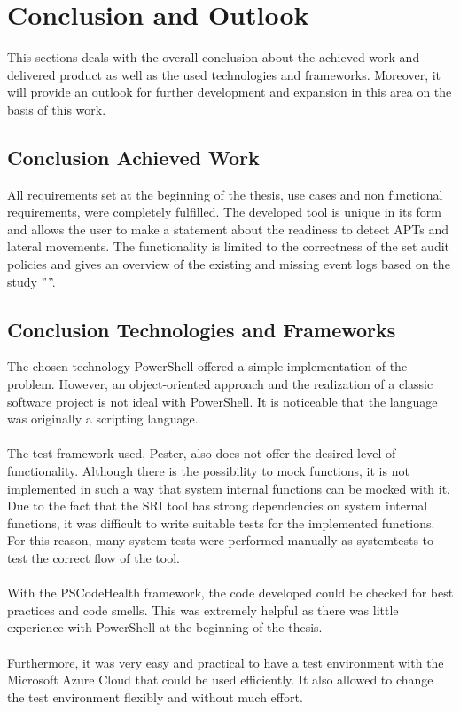 \section{Conclusion and Outlook}
This sections deals with the overall conclusion about the achieved work and delivered product as well as the used technologies and frameworks. Moreover, it will provide an outlook for further development and expansion in this area on the basis of this work.

\subsection{Conclusion Achieved Work}
All requirements set at the beginning of the thesis, use cases and non functional requirements, were completely fulfilled. The developed tool is unique in its form and allows the user to make a statement about the readiness to detect APTs and lateral movements. The functionality is limited to the correctness of the set audit policies and gives an overview of the existing and missing event logs based on the study ''''.

\subsection{Conclusion Technologies and Frameworks}
The chosen technology PowerShell offered a simple implementation of the problem. However, an object-oriented approach and the realization of a classic software project is not ideal with PowerShell. It is noticeable that the language was originally a scripting language.
\\\\
The test framework used, Pester, also does not offer the desired level of functionality. Although there is the possibility to mock functions, it is not implemented in such a way that system internal functions can be mocked with it. Due to the fact that the SRI tool has strong dependencies on system internal functions, it was difficult to write suitable tests for the implemented functions. For this reason, many system tests were performed manually as systemtests to test the correct flow of the tool.
\\\\
With the PSCodeHealth framework, the code developed could be checked for best practices and code smells. This was extremely helpful as there was little experience with PowerShell at the beginning of the thesis. 
\\\\
Furthermore, it was very easy and practical to have a test environment with the Microsoft Azure Cloud that could be used efficiently. It also allowed to change the test environment flexibly and without much effort.

